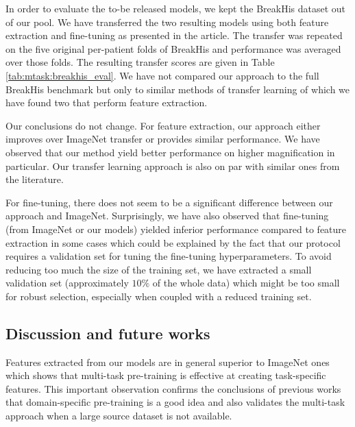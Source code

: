 In order to evaluate the to-be released models, we kept the BreakHis dataset \cite{spanhol2015dataset} out of our pool. We have transferred the two resulting models using both feature extraction and fine-tuning as presented in the article. The transfer was repeated on the five original per-patient folds of BreakHis and performance was averaged over those folds. The resulting transfer scores are given in Table \ref{tab:mtask:breakhis_eval}. We have not compared our approach to the full BreakHis benchmark but only to similar methods of transfer learning of which we have found two \cite{spanhol2017deep, song2017supervised} that perform feature extraction.

Our conclusions do not change. For feature extraction, our approach either improves over ImageNet transfer or provides similar performance. We have observed that our method yield better performance on higher magnification in particular. Our transfer learning approach is also on par with similar ones from the literature.

For fine-tuning, there does not seem to be a significant difference between our approach and ImageNet. Surprisingly, we have also observed that fine-tuning (from ImageNet or our models) yielded inferior performance compared to feature extraction in some cases which could be explained by the fact that our protocol requires a validation set for tuning the fine-tuning hyperparameters. To avoid reducing too much the size of the training set, we have extracted a small validation set (approximately $10\%$ of the whole data) which might be too small for robust selection, especially when coupled with a reduced training set.

\subsection{Discussion and future works}
\label{ssec:mtask:res:discussion}

Features extracted from our models are in general superior to ImageNet ones %
which shows that multi-task pre-training is effective at creating task-specific features. This important observation confirms the conclusions of previous works that domain-specific pre-training is a good idea and also validates the multi-task approach when a large source dataset is not available. 

